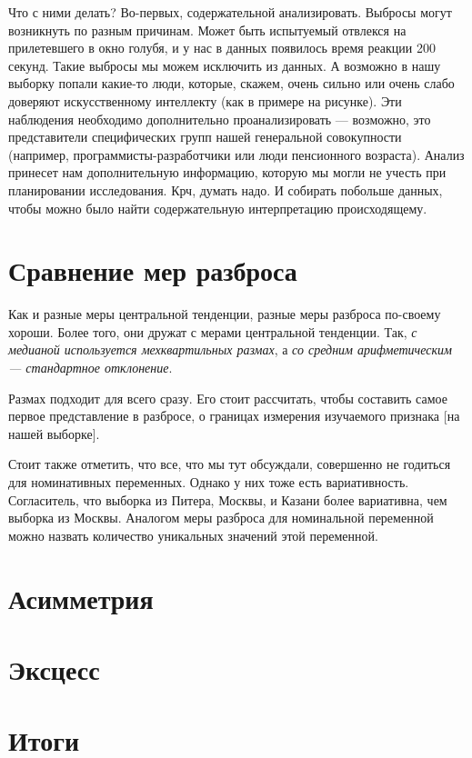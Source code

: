 \documentclass[
  letterpaper,
]{scrbook}
\theoremstyle{definition}
\theoremstyle{remark}
\begin{document}
Что с ними делать? Во-первых, содержательной анализировать. Выбросы
могут возникнуть по разным причинам. Может быть испытуемый отвлекся на
прилетевшего в окно голубя, и у нас в данных появилось время реакции 200
секунд. Такие выбросы мы можем исключить из данных. А возможно в нашу
выборку попали какие-то люди, которые, скажем, очень сильно или очень
слабо доверяют искусственному интеллекту (как в примере на рисунке). Эти
наблюдения необходимо дополнительно проанализировать --- возможно, это
представители специфических групп нашей генеральной совокупности
(например, программисты-разработчики или люди пенсионного возраста).
Анализ принесет нам дополнительную информацию, которую мы могли не
учесть при планировании исследования. Крч, думать надо. И собирать
побольше данных, чтобы можно было найти содержательную интерпретацию
происходящему.

\section{Сравнение мер
разброса}\label{andan-descriptives_variation_comparison}

Как и разные меры центральной тенденции, разные меры разброса по-своему
хороши. Более того, они дружат с мерами центральной тенденции. Так,
\emph{с медианой используется мехквартильных размах}, а \emph{со средним
арифметическим --- стандартное отклонение}.

Размах подходит для всего сразу. Его стоит рассчитать, чтобы составить
самое первое представление в разбросе, о границах измерения изучаемого
признака {[}на нашей выборке{]}.

Стоит также отметить, что все, что мы тут обсуждали, совершенно не
годиться для номинативных переменных. Однако у них тоже есть
вариативность. Согласитель, что выборка из Питера, Москвы, и Казани
более вариативна, чем выборка из Москвы. Аналогом меры разброса для
номинальной переменной можно назвать количество уникальных значений этой
переменной.

\section{Асимметрия}\label{andan-descriptives-skewness}

\section{Эксцесс}\label{andan-descriptives-kurtosis}

\section{Итоги}\label{andan-descriptives-final}
\end{document}
